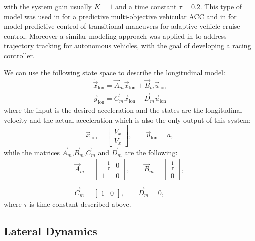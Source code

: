 with the system gain usually $K = 1$ and a time constant $\tau = 0.2$. This type of model was used in \cite{longitudinal_paper} for a predictive multi-objective vehicular ACC and in \cite{longitudinal_paper2} for model predictive control of transitional maneuvers for adaptive
vehicle cruise control. Moreover a similar modeling approach
was applied in \cite{longitudinal} to address trajectory tracking for autonomous vehicles, with the goal of developing a racing controller.

We can use the following state space to describe the longitudinal model:
\begin{equation}
\label{eqn:longi_dynamics_simple_model_ss}
\begin{array}{ll}
\dot{\vec{x}}_{\text{lon}} =\vec{A}_m \vec{x}_{\text{lon}}+ \vec{B}_m\vec{u}_{\text{lon}}\\
\vec{y}_{\text{lon}} =\vec{C}_m \vec{x}_{\text{lon}} + \vec{D}_m \vec{u}_{\text{lon}}
\end{array}
\end{equation}
where the input is the desired acceleration and the states are the longitudinal velocity and the actual acceleration which is also the only output of this system:
\begin{equation}
\vec{x}_{\text{lon}} = \begin{bmatrix}
\dot{V}_x\\V_x
\end{bmatrix},
\qquad
\vec{u}_{\text{lon}} = a,
\end{equation}
while the matrices $\vec{A}_m$,$\vec{B}_m$,$\vec{C}_m$ and $\vec{D}_m$ are the following:
\begin{equation}
\begin{array}{cc}
\vec{A}_m=\begin{bmatrix}
-\frac{1}{\tau}&0\\1&0
\end{bmatrix},
\qquad
\vec{B}_m=\begin{bmatrix}
\frac{1}{\tau}\\
0
\end{bmatrix},\\\\
\vec{C}_m=\begin{bmatrix}
1&0
\end{bmatrix}, 
\qquad
\vec{D}_m=0,
\end{array}
\end{equation}
where $\tau$ is time constant described above. 

\subsection{Lateral Dynamics}

